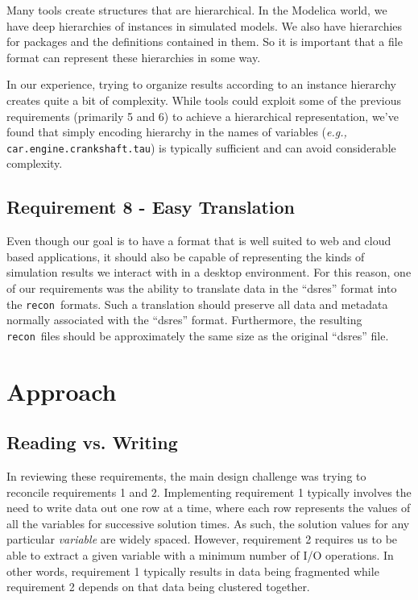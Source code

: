 \documentclass[11pt,a4paper,twocolumn]{article}
\newcommand{\recon}{\texttt{recon}}
\newcommand{\code}[1]{\texttt{#1}} %
\begin{document}
Many tools create structures that are hierarchical.  In the Modelica
world, we have deep hierarchies of instances in simulated models.  We
also have hierarchies for packages and the definitions contained in
them.  So it is important that a file format can represent these
hierarchies in some way.

In our experience, trying to organize results according to an instance
hierarchy creates quite a bit of complexity.  While tools could
exploit some of the previous requirements (primarily 5 and 6) to
achieve a hierarchical representation, we've found that simply
encoding hierarchy in the names of variables (\textit{e.g.,}
\code{car.engine.crankshaft.tau}) is typically sufficient and can
avoid considerable complexity.

\subsection{Requirement 8 - Easy Translation}


Even though our goal is to have a format that is well suited to web
and cloud based applications, it should also be capable of
representing the kinds of simulation results we interact with in a
desktop environment.  For this reason, one of our requirements was the
ability to translate data in the ``dsres'' format into the
\recon\ formats.  Such a translation should preserve all data and
metadata normally associated with the ``dsres'' format.  Furthermore,
the resulting \recon\ files should be approximately the same size as
the original ``dsres'' file.

\section{Approach}

\subsection{Reading vs. Writing}

In reviewing these requirements, the main design challenge was trying
to reconcile requirements 1 and 2.  Implementing requirement 1
typically involves the need to write data out one row at a time, where
each row represents the values of all the variables for successive
solution times.  As such, the solution values for any particular
\textit{variable} are widely spaced.  However, requirement 2 requires
us to be able to extract a given variable with a minimum number of I/O
operations.  In other words, requirement 1 typically results in data
being fragmented while requirement 2 depends on that data being
clustered together.
\end{document}
